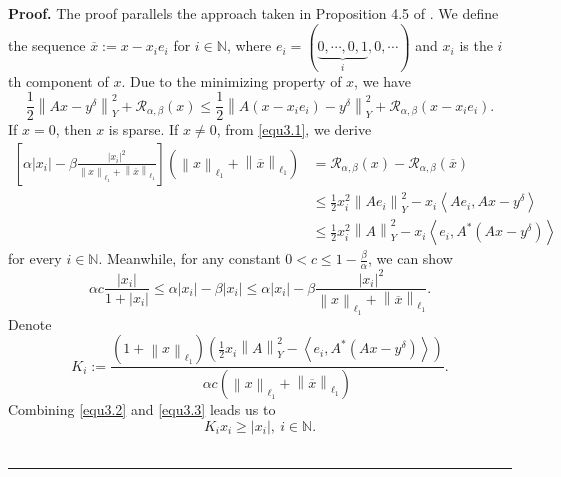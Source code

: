 \documentclass[a4paper,12pt]{article}
\numberwithin{equation}{section}
\newenvironment{proof}[1][Proof]{\textbf{#1.} }
{\ \rule{0.75em}{0.75em}\smallskip}
\begin{document}
\begin{proof}
    The proof parallels the approach taken in Proposition 4.5 of \cite{G10}. We define the sequence $\overline{x}:=x-x_{i}e_{i}$ for $i\in\mathbb{N}$, where $e_{i}=(\underbrace{0,\cdots,0,1}_{i},0,\cdots)$ and $x_{i}$ is the $i$th component of $x$. Due to the minimizing property of $x$, we have
    \begin{equation}\label{equ3.1}
        \frac{1}{2}\left\|Ax-y^{\delta}\right\|_{Y}^{2}+\mathcal{R}_{\alpha,\beta}\left(x\right) \leq \frac{1}{2}\left\|A\left(x-x_{i}e_{i}\right)-y^{\delta}\right\|_{Y}^{2}+ \mathcal{R}_{\alpha,\beta}\left(x-x_{i}e_{i}\right).
    \end{equation} 
    If $x=0$, then $x$ is sparse. If $x\neq 0$, from \eqref{equ3.1}, we derive
    \begin{align}\label{equ3.2}
        \left[\alpha\left|x_{i}\right|-\beta\frac{\left|x_{i}\right|^{2}}{\left\|x\right\|_{\ell_{1}} +\left\|\overline{x}\right\|_{\ell_{1}}}\right]\left(\left\|x\right\|_{\ell_{1}} +\left\|\overline{x}\right\|_{\ell_{1}}\right)
        & = \mathcal{R}_{\alpha,\beta}\left(x\right)-\mathcal{R}_{\alpha,\beta}\left(\overline{x}\right) \nonumber\\
        & \leq \frac{1}{2}x_{i}^{2}\left\|Ae_{i}\right\|_{Y}^{2}-x_{i}\left<Ae_{i},Ax-y^{\delta}\right> \nonumber\\
        & \leq \frac{1}{2}x_{i}^{2}\left\|A\right\|_{Y}^{2}-x_{i}\left<e_{i},A^{*}\left(Ax-y^{\delta} \right)\right>
    \end{align}
    for every $i\in\mathbb{N}$. Meanwhile, for any constant $0<c\leq 1-\frac{\beta}{\alpha}$, we can show
    \begin{equation}\label{equ3.3}
        \alpha c\frac{\left|x_{i}\right|}{1+\left|x_{i}\right|}\leq \alpha\left|x_{i}\right|-\beta\left|x_{i}\right|\leq \alpha\left|x_{i}\right|-\beta\frac{\left|x_{i}\right|^{2}}{\left\|x\right\|_{\ell_{1}} +\left\|\overline{x}\right\|_{\ell_{1}}}.
    \end{equation}
    Denote
    \begin{equation*}
        K_{i}:=\frac{\left(1+\left\|x\right\|_{\ell_{1}}\right)\left( \frac{1}{2}x_{i}\left\|A\right\|_{Y}^{2}-\left<e_{i},A^{*}\left(Ax-y^{\delta} \right)\right>\right)}{\alpha c\left(\left\|x\right\|_{\ell_{1}}+ \left\|\overline{x}\right\|_{\ell_{1}}\right)}.
    \end{equation*}
    Combining \eqref{equ3.2} and \eqref{equ3.3} leads us to
    \begin{equation*}
        K_{i}x_{i}\geq \left|x_{i}\right|,\ i\in\mathbb{N}.

\end{equation*}
\end{proof}
\end{document}
